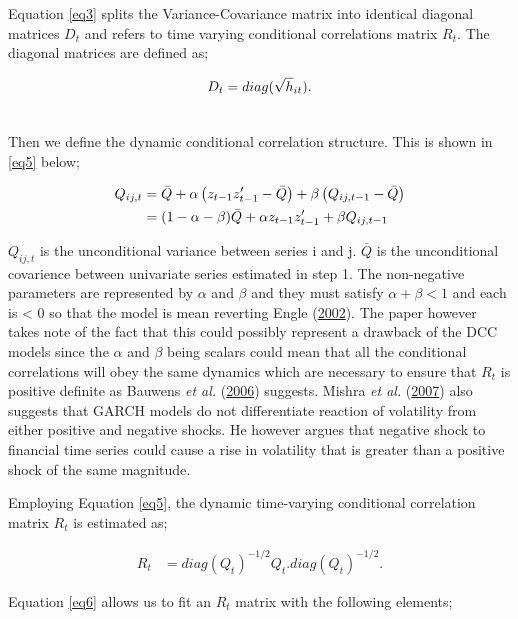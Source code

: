 \documentclass[11pt,preprint, authoryear]{elsarticle}
\numberwithin{equation}{section}
\numberwithin{figure}{section}
\numberwithin{table}{section}
\begin{document}
Equation \ref{eq3} splits the Variance-Covariance matrix into identical
diagonal matrices \(D_t\) and refers to time varying conditional
correlations matrix \(R_t\). The diagonal matrices are defined as;

\begin{align} 
D_t = diag(\sqrt h_{it}). \label {eq4} \\ \notag
 \end{align}

Then we define the dynamic conditional correlation structure. This is
shown in \ref{eq5} below;

\begin{align}  \label {eq5}
Q_{ij,t} &= \bar Q + \alpha\left(z_{t - 1}z'_{t - 1} - \bar{Q} \right) + \beta\left( Q_{ij, t - 1} - \bar{Q} \right) \hfill \\ \notag  &= (1 - \alpha - \beta)\bar{Q} + \alpha z_{t - 1}z'_{t - 1} + \beta Q_{ij, t - 1} \notag
\end{align}

\(Q_{ij,t}\) is the unconditional variance between series i and j.
\(\bar{Q}\) is the unconditional covarience between univariate series
estimated in step 1. The non-negative parameters are represented by
\(\alpha\) and \(\beta\) and they must satisfy \(\alpha + \beta < 1\)
and each is \textless{} 0 so that the model is mean reverting Engle
(\protect\hyperlink{ref-engle2002}{2002}). The paper however takes note
of the fact that this could possibly represent a drawback of the DCC
models since the \(\alpha\) and \(\beta\) being scalars could mean that
all the conditional correlations will obey the same dynamics which are
necessary to ensure that \(R_t\) is positive definite as Bauwens
\emph{et al.} (\protect\hyperlink{ref-bauwens2006}{2006}) suggests.
Mishra \emph{et al.} (\protect\hyperlink{ref-mishra2007}{2007}) also
suggests that GARCH models do not differentiate reaction of volatility
from either positive and negative shocks. He however argues that
negative shock to financial time series could cause a rise in volatility
that is greater than a positive shock of the same magnitude.

Employing Equation \ref{eq5}, the dynamic time-varying conditional
correlation matrix \(R_t\) is estimated as;

\begin{align}   \label{eq6}
R_t &= diag(Q_t)^{-1/2}Q_t.diag(Q_t)^{-1/2}. 
\end{align}

Equation \ref{eq6} allows us to fit an \(R_t\) matrix with the following
elements;
\end{document}
